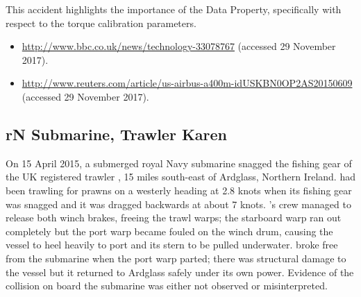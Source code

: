 This accident highlights the importance of the  Data Property, specifically with respect to the torque calibration parameters.

\begin{samepage}
\begin{itemize}
  \item \raggedright{\href{http://www.bbc.co.uk/news/technology-33078767}{http://www.bbc.co.uk/news/technology-33078767} (accessed 29 November 2017).}
  \item \raggedright{\href{http://www.reuters.com/article/us-airbus-a400m-idUSKBN0OP2AS20150609}{http://www.reuters.com/article/us-airbus-a400m-idUSKBN0OP2AS20150609} (accessed 29 November 2017).}
\end{itemize}
\end{samepage}


\subsection{rN Submarine, Trawler Karen} \label{bkm:incacc:subtrawler}
On 15 April 2015, a submerged royal Navy submarine snagged the fishing gear of the UK registered trawler , 15 miles south-east of Ardglass, Northern Ireland.  had been trawling for prawns on a westerly heading at 2.8 knots when its fishing gear was snagged and it was dragged backwards at about 7 knots. 's crew managed to release both winch brakes, freeing the trawl warps; the starboard warp ran out completely but the port warp became fouled on the winch drum, causing the vessel to heel heavily to port and its stern to be pulled underwater.  broke free from the submarine when the port warp parted; there was structural damage to the vessel but it returned to Ardglass safely under its own power. Evidence of the collision on board the submarine was either not observed or misinterpreted. 

